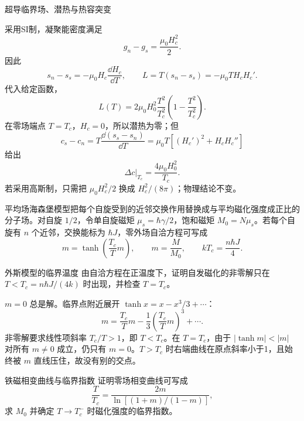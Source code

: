 {\begin{advexamplebox}{超导临界场、潜热与热容突变}
\AQSuperconductivity
\end{advexamplebox}
\begin{advsolution}
\AASuperconductivity

采用SI制，凝聚能密度满足
\[
 g_n-g_s=\frac{\mu_0H_c^2}{2}.
\]
因此
\[
 s_n-s_s=-\mu_0H_c\frac{\dd H_c}{\dd T},
 \qquad
 L=T(s_n-s_s)=-\mu_0TH_cH_c'.
\]
代入给定函数，
\[
 \boxed{L(T)=2\mu_0H_0^2\frac{T^2}{T_c^2}
 \left(1-\frac{T^2}{T_c^2}\right)}.
\]
在零场端点 $T=T_c$，$H_c=0$，所以潜热为零；但
\[
 c_s-c_n=T\frac{\dd(s_s-s_n)}{\dd T}
 =\mu_0T[(H_c')^2+H_cH_c'']
\]
给出
\[
 \boxed{\Delta c\big|_{T_c}=\frac{4\mu_0H_0^2}{T_c}}.
\]
若采用高斯制，只需把 $\mu_0H_c^2/2$ 换成 $H_c^2/(8\pi)$；物理结论不变。
\end{advsolution}

平均场海森堡模型把每个自旋受到的近邻交换作用替换成与平均磁化强度成正比的分子场。对自旋 $1/2$，令单自旋磁矩 $\mu_s=\hbar\gamma/2$，饱和磁矩 $M_0=N\mu_s$。若每个自旋有 $n$ 个近邻，交换能标为 $\hbar J$，零外场自洽方程可写成
\begin{equation}\label{advA2:eq:weiss-self-consistent}
 m=\tanh\!\left(\frac{T_c}{T}m\right),
 \qquad m=\frac M{M_0},\qquad
 kT_c=\frac{n\hbar J}{4}.
\end{equation}

\begin{advexamplebox}{外斯模型的临界温度}\label{advA2:ex:weiss-critical}
由自洽方程在正温度下，证明自发磁化的非零解只在 $T<T_c=n\hbar J/(4k)$ 时出现，并检查 $T=T_c$。

\AQWeissCritical
\end{advexamplebox}
\begin{advsolution}
\AAWeissCritical

$m=0$ 总是解。临界点附近展开 $\tanh x=x-x^3/3+\cdots$：
\[
 m=\frac{T_c}{T}m-\frac13\left(\frac{T_c}{T}m\right)^3+\cdots.
\]
非零解要求线性项斜率 $T_c/T>1$，即 $T<T_c$。在 $T=T_c$，由于 $|\tanh m|<|m|$ 对所有 $m\ne0$ 成立，仍只有 $m=0$。$T>T_c$ 时右端曲线在原点斜率小于1，且始终被 $m$ 直线压住，故没有别的交点。
\end{advsolution}

\begin{advexamplebox}{铁磁相变曲线与临界指数}\label{advA2:ex:weiss-curve}
证明零场相变曲线可写成
\[
 \frac{T}{T_c}=\frac{2m}{\ln[(1+m)/(1-m)]},
\]
求 $M_0$ 并确定 $T\to T_c^-$ 时磁化强度的临界指数。


\end{advexamplebox}}
